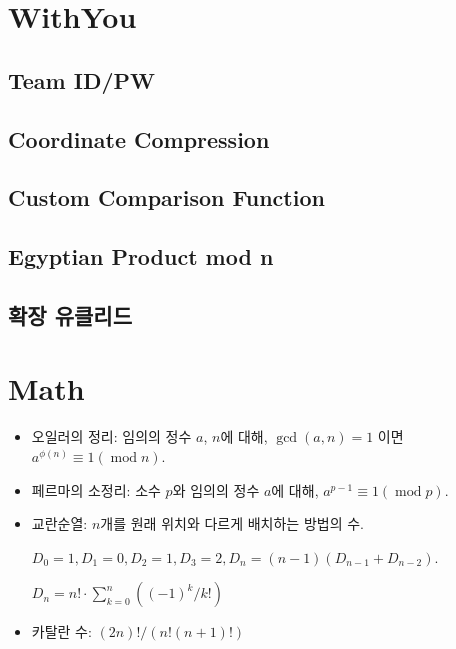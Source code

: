 \documentclass[10pt,landscape,a4paper,twocolumn]{article}
\begin{document}
\tableofcontents

\section{WithYou}
\subsection{Team ID/PW}

\subsection{Coordinate Compression}


\subsection{Custom Comparison Function}


\subsection{Egyptian Product mod n}


\subsection{확장 유클리드}


\section{Math}
\begin{itemize}
	\item 오일러의 정리: 임의의 정수 $ a $, $ n $에 대해,
	$ \operatorname{gcd}(a,n) = 1 $ 이면
	$ a^{\phi(n)} \equiv 1 (\operatorname{mod} n) $.
	
	\item 페르마의 소정리: 소수 $ p $와 임의의 정수 $ a $에 대해,
	$ a^{p-1} \equiv 1 (\operatorname{mod} p) $.
	
	\item 교란순열: $ n $개를 원래 위치와 다르게 배치하는 방법의 수.
	
	$ D_{0}=1, D_{1}=0, D_{2}=1, D_{3}=2, D_{n} = (n-1)(D_{n-1} + D_{n-2}) $.
	
	$ D_{n} = n! \cdot \sum_{k=0}^{n} \left((-1)^{k} / k!\right) $
	
	\item 카탈란 수: $ (2n)! / (n!(n+1)!) $
	
%	
%	
	
\end{itemize}
\end{document}
